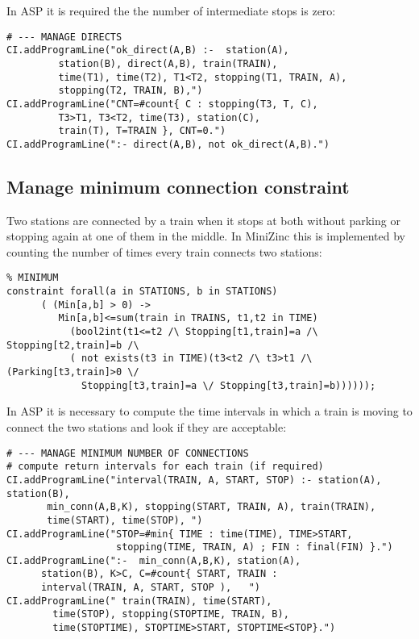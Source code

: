 \documentclass[11pt]{article}
\begin{document}
In ASP it is required the the number of intermediate stops is zero:

\begin{verbatim}
# --- MANAGE DIRECTS
CI.addProgramLine("ok_direct(A,B) :-  station(A),
         station(B), direct(A,B), train(TRAIN), 
         time(T1), time(T2), T1<T2, stopping(T1, TRAIN, A),
         stopping(T2, TRAIN, B),")
CI.addProgramLine("CNT=#count{ C : stopping(T3, T, C),
         T3>T1, T3<T2, time(T3), station(C),
         train(T), T=TRAIN }, CNT=0.")
CI.addProgramLine(":- direct(A,B), not ok_direct(A,B).")
\end{verbatim}

\subsection{Manage minimum connection constraint}

Two stations are connected by a train when it stops at both without parking 
or stopping again at one of them in the middle. In MiniZinc this is implemented
by counting the number of times every train connects two stations:
\begin{verbatim}
% MINIMUM
constraint forall(a in STATIONS, b in STATIONS)
      ( (Min[a,b] > 0) -> 
         Min[a,b]<=sum(train in TRAINS, t1,t2 in TIME)
           (bool2int(t1<=t2 /\ Stopping[t1,train]=a /\ Stopping[t2,train]=b /\
           ( not exists(t3 in TIME)(t3<t2 /\ t3>t1 /\ (Parking[t3,train]>0 \/
             Stopping[t3,train]=a \/ Stopping[t3,train]=b))))));
\end{verbatim}

In ASP it is necessary to compute the time intervals in which a train is 
moving to connect the two stations and look if they are acceptable:

\begin{verbatim}
# --- MANAGE MINIMUM NUMBER OF CONNECTIONS
# compute return intervals for each train (if required)
CI.addProgramLine("interval(TRAIN, A, START, STOP) :- station(A), station(B),
       min_conn(A,B,K), stopping(START, TRAIN, A), train(TRAIN),
       time(START), time(STOP), ")
CI.addProgramLine("STOP=#min{ TIME : time(TIME), TIME>START,
                   stopping(TIME, TRAIN, A) ; FIN : final(FIN) }.")
CI.addProgramLine(":-  min_conn(A,B,K), station(A),
      station(B), K>C, C=#count{ START, TRAIN :
      interval(TRAIN, A, START, STOP ),   ")
CI.addProgramLine(" train(TRAIN), time(START),
        time(STOP), stopping(STOPTIME, TRAIN, B),
        time(STOPTIME), STOPTIME>START, STOPTIME<STOP}.")
\end{verbatim}
\end{document}
